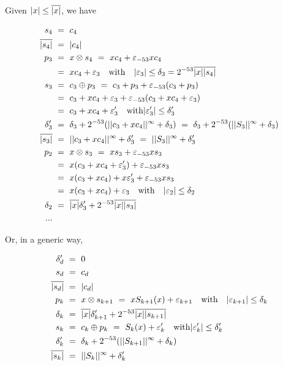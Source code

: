 Given $ |x| \leq {\overline{|x|}}$, we have

\begin{align*}
  s_4 & \ = \ c_4\\
  \overline{|s_{4}|} & \ = \  |c_4|\\
  p_3 & \ = \  x \otimes s_4 \ = \  x c_4 + \varepsilon_{-53} x c_4 \\
      & \ = \  xc_4 + \varepsilon_3 \quad \mathrm{with} \quad |\varepsilon_3| \le \delta_3 = 2^{-53}{\overline{|x|}} \overline{|s_{4}|}\\
  s_3 & \ = \  c_3 \oplus p_3 \ = \  c_3 + p_3 + \varepsilon_{-53}(c_3 + p_3) \\
      & \ = \  c_3 +  xc_4 + \varepsilon_3 + \varepsilon_{-53}(c_3 + xc_4 + \varepsilon_3) \\
      & \ = \  c_3 +  xc_4 + \varepsilon'_3  
      \quad \mathrm{with} |\varepsilon'_3| \le \delta'_3\\
  \delta'_3 & \ =\  \delta_3 + 2^{-53}(||{c_3 + xc_4}||^{\infty} + \delta_3)\  =\  \delta_3 + 2^{-53}(||{S_3}||^{\infty} + \delta_3)\\
  \overline{|s_{3}|} & \ = \  ||{c_3 + xc_4}||^{\infty} + \delta'_3 \ = \  ||{S_3}||^{\infty} + \delta'_3\\
  p_2 & \ = \  x \otimes s_3 \ = \  x s_3 + \varepsilon_{-53} x s_3 \\
      & \ = \  x(c_3 +  xc_4 + \varepsilon'_3) + \varepsilon_{-53} x s_3\\
      & \ = \  x(c_3 +  xc_4) + x\varepsilon'_3 + \varepsilon_{-53} x s_3\\
      & \ = \  x(c_3 +  xc_4) +  \varepsilon_3 \quad \mathrm{with} \quad 
      |\varepsilon_2| \le \delta_2\\
  \delta_2 & \ =\ {\overline{|x|}}\delta'_3 + 2^{-53} {\overline{|x|}} \overline{|s_{3}|}\\
...\\
\end{align*}

Or, in a generic way, 

\begin{align*}
\delta'_d &\ = \ 0 \\
s_d & \ = \ c_d\\
\overline{|s_{d}|} & \ = \  |c_d|\\
p_{k}  & \ = \  x \otimes s_{k+1} \ = \ xS_{k+1}(x) + \varepsilon_{k+1}         \quad \mathrm{with} \quad  |\varepsilon_{k+1}| \le \delta_{k}\\
\delta_k & \ =\ {\overline{|x|}}\delta'_{k+1} + 2^{-53} {\overline{|x|}} \overline{|s_{k+1}|}\\
s_{k}  & \ = \  c_k \oplus p_k \  = \  S_{k}(x) + \varepsilon'_k      \quad \mathrm{with} |\varepsilon'_k| \le \delta'_k\\
\delta'_k & \ =\  \delta_k + 2^{-53}(||{S_{k+1}}||^{\infty} + \delta_{k})\\
\overline{|s_{k}|} & \ = \   ||{S_k}||^{\infty} + \delta'_k\\
\end{align*}


